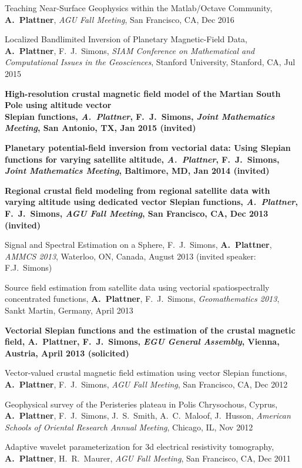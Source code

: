 \documentclass[10pt]{article}
\begin{document}
\spcp
Teaching Near-Surface Geophysics within the Matlab/Octave Community,
\textbf{A.~Plattner}, 
\emph{AGU Fall Meeting}, San Francisco, CA, Dec 2016

\spcp
Localized Bandlimited Inversion of Planetary Magnetic-Field Data,
\textbf{A.~Plattner}, F.~J.~Simons,
\emph{SIAM Conference on Mathematical and Computational Issues in the Geosciences},
Stanford University, Stanford, CA, Jul 2015


\spcp
\textbf{High-resolution crustal magnetic field model of the Martian South Pole using altitude vector\\ Slepian functions,
\emph{A.~Plattner}, F.~J.~Simons,
\emph{Joint Mathematics Meeting}, San Antonio, TX, Jan 2015 (invited)}

\spcp
\textbf{Planetary potential-field inversion from vectorial data: Using Slepian functions for varying satellite altitude,
\emph{A.~Plattner}, F.~J.~Simons,
\emph{Joint Mathematics Meeting}, Baltimore, MD, Jan 2014 (invited)}

\spcp
\textbf{Regional crustal field modeling from regional satellite data with varying altitude using dedicated vector Slepian functions,
\emph{A.~Plattner}, F.~J.~Simons,
\emph{AGU Fall Meeting}, San Francisco, CA, Dec 2013 (invited)}

\spcp
Signal and Spectral Estimation on a Sphere,
F.~J.~Simons, \textbf{A.~Plattner},
\emph{AMMCS 2013}, Waterloo, ON, Canada, August 2013 (invited speaker: F.J.~Simons)

\spcp
Source field estimation from satellite data using vectorial spatiospectrally 
concentrated functions,
\textbf{A.~Plattner}, F.~J.~Simons,
\emph{Geomathematics 2013}, Sankt Martin, Germany, April 2013

\spcp
\textbf{Vectorial Slepian functions and the estimation of the crustal magnetic field,
A.~Plattner, F.~J.~Simons,
\emph{EGU General Assembly}, Vienna, Austria, April 2013 (solicited)}

\spcp
Vector-valued crustal magnetic field estimation using vector Slepian functions,
\textbf{A.~Plattner}, F.~J.~Simons,
\emph{AGU Fall Meeting}, San Francisco, CA, Dec 2012

\spcp
Geophysical survey of the Peristeries plateau in Polis Chrysochous, Cyprus,
\textbf{A.~Plattner}, F.~J.~Simons, J.~S.~Smith, A.~C.~Maloof, J.~Husson,
\emph{American Schools of Oriental Research Annual Meeting}, Chicago, IL, Nov 2012

\spcp
Adaptive wavelet parameterization for 3d electrical resistivity tomography,
\textbf{A.~Plattner}, H.~R.~Maurer, 
\emph{AGU Fall Meeting}, San Francisco, CA, Dec 2011
\end{document}
